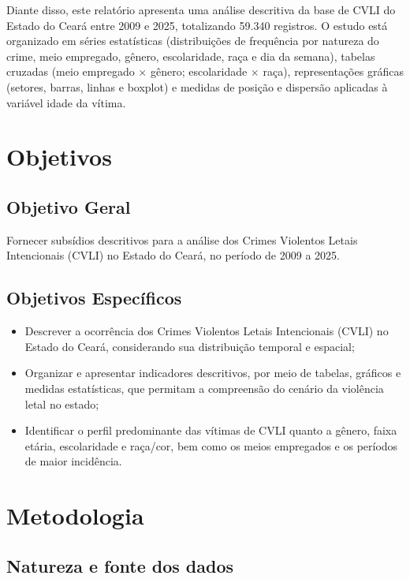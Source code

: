 \documentclass[12pt,a4paper]{article}
\begin{document}
Diante disso, este relatório apresenta uma análise descritiva da base de CVLI do Estado do Ceará entre 2009 e 2025, totalizando 59.340 registros. O estudo está organizado em séries estatísticas (distribuições de frequência por natureza do crime, meio empregado, gênero, escolaridade, raça e dia da semana), tabelas cruzadas (meio empregado $\times$ gênero; escolaridade $\times$ raça), representações gráficas (setores, barras, linhas e boxplot) e medidas de posição e dispersão aplicadas à variável idade da vítima.

\newpage

\section{Objetivos}

\subsection{Objetivo Geral}

Fornecer subsídios descritivos para a análise dos Crimes Violentos Letais Intencionais (CVLI) no Estado do Ceará, no período de 2009 a 2025.

\subsection{Objetivos Específicos}

\begin{itemize}
    \item Descrever a ocorrência dos Crimes Violentos Letais Intencionais (CVLI) no Estado do Ceará, considerando sua distribuição temporal e espacial;
    \item Organizar e apresentar indicadores descritivos, por meio de tabelas, gráficos e medidas estatísticas, que permitam a compreensão do cenário da violência letal no estado;
    \item Identificar o perfil predominante das vítimas de CVLI quanto a gênero, faixa etária, escolaridade e raça/cor, bem como os meios empregados e os períodos de maior incidência.
\end{itemize}

\newpage

\section{Metodologia}

\subsection{Natureza e fonte dos dados}
\end{document}
